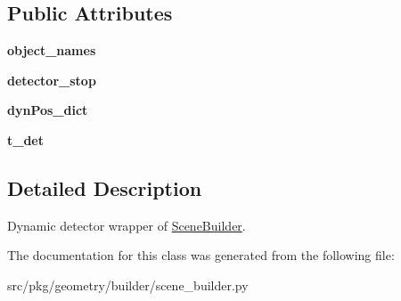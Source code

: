 \subsection*{Public Attributes}
\begin{DoxyCompactItemize}
\item 
\mbox{\label{classrnb-planning_1_1src_1_1pkg_1_1geometry_1_1builder_1_1scene__builder_1_1_dynamic_detector_adad4a4583ff2936883172391cc6f06bc}} 
{\bfseries object\+\_\+names}
\item 
\mbox{\label{classrnb-planning_1_1src_1_1pkg_1_1geometry_1_1builder_1_1scene__builder_1_1_dynamic_detector_a00f2026863eace4d7af82189027cd305}} 
{\bfseries detector\+\_\+stop}
\item 
\mbox{\label{classrnb-planning_1_1src_1_1pkg_1_1geometry_1_1builder_1_1scene__builder_1_1_dynamic_detector_a1f7443490c42346b6c4611238383da7f}} 
{\bfseries dyn\+Pos\+\_\+dict}
\item 
\mbox{\label{classrnb-planning_1_1src_1_1pkg_1_1geometry_1_1builder_1_1scene__builder_1_1_dynamic_detector_a0b440ba5e8525dcaa49f18938b61efca}} 
{\bfseries t\+\_\+det}
\end{DoxyCompactItemize}


\subsection{Detailed Description}
Dynamic detector wrapper of \hyperlink{classrnb-planning_1_1src_1_1pkg_1_1geometry_1_1builder_1_1scene__builder_1_1_scene_builder}{Scene\+Builder}. 

The documentation for this class was generated from the following file\+:\begin{DoxyCompactItemize}
\item 
src/pkg/geometry/builder/scene\+\_\+builder.\+py\end{DoxyCompactItemize}
